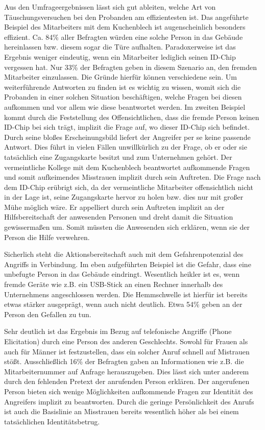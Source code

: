 Aus den Umfrageergebnissen lässt sich gut ableiten, welche Art von Täuschungsversuchen bei den Probanden am effizientesten ist.
Das angeführte Beispiel des Mitarbeiters mit dem Kuchenblech ist augenscheinlich besonders effizient.
Ca. 84\% aller Befragten würden eine solche Person in das Gebäude hereinlassen bzw. diesem sogar die Türe aufhalten.
Paradoxerweise ist das Ergebnis weniger eindeutig, wenn ein Mitarbeiter lediglich seinen ID-Chip vergessen hat.
Nur 33\% der Befragten geben in diesem Szenario an, den fremden Mitarbeiter einzulassen.
Die Gründe hierfür können verschiedene sein.
Um weiterführende Antworten zu finden ist es wichtig zu wissen, womit sich die Probanden in einer solchen Situation beschäftigen, welche Fragen bei diesen aufkommen und vor allem wie diese beantwortet werden.
Im zweiten Beispiel kommt durch die Feststellung des Offensichtlichen, dass die fremde Person keinen ID-Chip bei sich trägt, implizit die Frage auf, wo dieser ID-Chip sich befindet.
Durch seine bloßes Erscheinungsbild liefert der Angreifer per se keine passende Antwort.
Dies führt in vielen Fällen unwillkürlich zu der Frage, ob er oder sie tatsächlich eine Zugangskarte besitzt und zum Unternehmen gehört.
Der vermeintliche Kollege mit dem Kuchenblech beantwortet aufkommende Fragen und somit aufkeimendes Misstrauen implizit durch sein Auftreten.
Die Frage nach dem ID-Chip erübrigt sich, da der vermeintliche Mitarbeiter offensichtlich nicht in der Lage ist, seine Zugangskarte hervor zu holen bzw. dies nur mit großer Mühe möglich wäre.
Er appelliert durch sein Auftreten implizit an der Hilfsbereitschaft der anwesenden Personen und dreht damit die Situation gewissermaßen um.
Somit müssten die Anwesenden sich erklären, wenn sie der Person die Hilfe verwehren.

Sicherlich steht die Aktionsbereitschaft auch mit dem Gefahrenpotenzial des Angriffs in Verbindung.
Im eben aufgeführten Beispiel ist die Gefahr, dass eine unbefugte Person in das Gebäude eindringt.
Wesentlich heikler ist es, wenn fremde Geräte wie z.B. ein USB-Stick an einen Rechner innerhalb des Unternehmens angeschlossen werden.
Die Hemmschwelle ist hierfür ist bereits etwas stärker ausgeprägt, wenn auch nicht deutlich.
Etwa 54\% geben an der Person den Gefallen zu tun.

Sehr deutlich ist das Ergebnis im Bezug auf telefonische Angriffe (Phone Elicitation) durch eine Person des anderen Geschlechts.
Sowohl für Frauen als auch für Männer ist festzustellen, dass ein solcher Anruf schnell auf Mistrauen stößt.
Ausschließlich 16\% der Befragten gaben an Informationen wie z.B. die Mitarbeiternummer auf Anfrage herauszugeben.
Dies lässt sich unter anderem durch den fehlenden Pretext der anrufenden Person erklären.
Der angerufenen Person bieten sich wenige Möglichkeiten aufkommende Fragen zur Identität des Angreifers implizit zu beantworten.
Durch die geringe Persönlichkeit des Anrufs ist auch die Basislinie an Misstrauen bereits wesentlich höher als bei einem tatsächlichen Identitätsbetrug.


